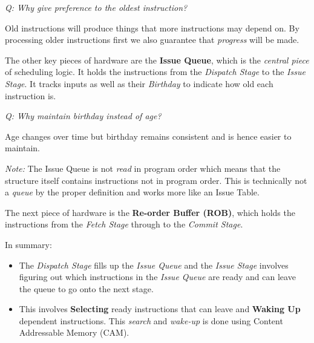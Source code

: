 \documentclass[12pt]{article}
\newenvironment{QandA}{\begin{enumerate}[label=\bfseries\arabic*.]\bfseries}
                      {\end{enumerate}}
\newenvironment{answered}{\par\quad\normalfont}{}
\begin{document}
\begin{QandA}
\begin{answered}
\textit{Q: Why give preference to the oldest instruction?}

\quad Old instructions will produce things that more instructions may depend on. By processing older instructions first we also guarantee that \textit{progress} will be made. 

The other key pieces of hardware are the \textbf{Issue Queue}, which is the \textit{central piece} of scheduling logic. It holds the instructions from the \textit{Dispatch Stage} to the \textit{Issue Stage}. It tracks  inputs as well as their \textit{Birthday} to indicate how old each instruction is. 

\textit{Q: Why maintain birthday instead of age?}

\quad Age changes over time but birthday remains consistent and is hence easier to maintain. 

\textit{Note:} The Issue Queue is not \textit{read} in program order which means that the structure itself contains instructions not in program order. This is technically not a \textit{queue} by the proper definition and works more like an Issue Table. 

The next piece of hardware is the \textbf{Re-order Buffer (ROB)}, which holds the instructions from the \textit{Fetch Stage} through to the \textit{Commit Stage}. 

In summary:
\begin{itemize}
    \item The \textit{Dispatch Stage} fills up the \textit{Issue Queue} and the \textit{Issue Stage} involves figuring out which instructions in the \textit{Issue Queue} are ready and can leave the queue to go onto the next stage.
    \item This involves \textbf{Selecting} ready instructions that can leave and \textbf{Waking Up} dependent instructions. This \textit{search} and \textit{wake-up} is done using Content Addressable Memory (CAM).
\end{itemize}  


\end{answered}


\end{QandA}
\end{document}
